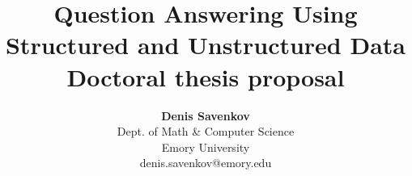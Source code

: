 \documentclass[12pt]{report}
\renewcommand{\baselinestretch}{1}
\begin{document}
\renewcommand{\baselinestretch}{1.3}



\setlength{\headsep}{0.15in}
\setlength{\topmargin}{-.5in}
\pagestyle{empty}



\title{
\textbf{Question Answering Using Structured and Unstructured Data} \\
\normalfont Doctoral thesis proposal}
\author{\textbf{Denis Savenkov}\\
      Dept. of Math \& Computer Science\\
      Emory University\\
      denis.savenkov@emory.edu
}



\mydate

\maketitle
\end{document}
